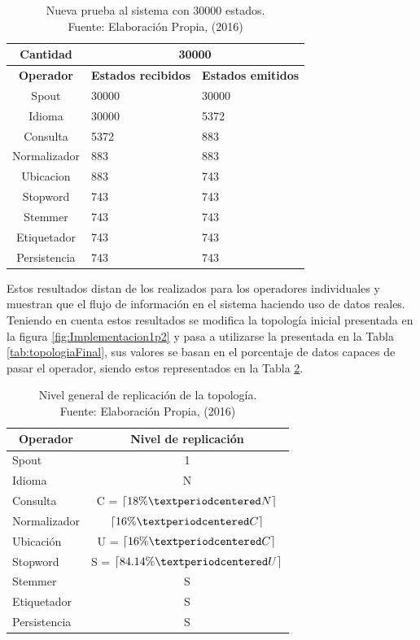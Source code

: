 \begin{table}[H]
\centering
\caption[Nueva prueba al sistema con 30000 estados.]{Nueva prueba al sistema con 30000 estados.\\Fuente: Elaboración Propia, (2016)}
\label{tab:sistemaCompletoEstadosCorregidos}
\begin{tabular}{|c|l|l|}
\hline
\textbf{Cantidad} & \multicolumn{2}{c|}{\textbf{30000}} \\ \hline
\textbf{Operador} & \multicolumn{1}{c|}{\textbf{Estados recibidos}} & \multicolumn{1}{c|}{\textbf{Estados emitidos}} \\ \hline
Spout & 30000 & 30000 \\ \hline
Idioma & 30000 & 5372 \\ \hline
Consulta & 5372 & 883 \\ \hline
Normalizador & 883 & 883 \\ \hline
Ubicacion & 883 & 743 \\ \hline
Stopword & 743 & 743 \\ \hline
Stemmer & 743 & 743 \\ \hline
Etiquetador & 743 & 743 \\ \hline
Persistencia & 743 & 743 \\ \hline
\end{tabular}
\end{table}

Estos resultados distan de los realizados para los operadores individuales y muestran que el flujo de información en el sistema haciendo uso de datos reales. Teniendo en cuenta estos resultados se modifica la topología inicial presentada en la figura \ref{fig:Implementacion1p2} y pasa a utilizarse la presentada en la Tabla \ref{tab:topologiaFinal}, sus valores se basan en el porcentaje de datos capaces de pasar el operador, siendo estos representados en la Tabla \ref{tab:topologiaFinal2}.

\begin{table}[H]
\caption[Nivel general de replicación de la topología.]{Nivel general de replicación de la topología.\\Fuente: Elaboración Propia, (2016)}
\centering
\label{tab:topologiaFinal2}
\begin{tabular}{|l|c|}
\hline
\multicolumn{1}{|c|}{\textbf{Operador}} & \textbf{Nivel de replicación} \\ \hline
Spout & 1 \\ \hline
Idioma & N \\ \hline
Consulta & C = $\ceil{18\% · N}$ \\ \hline
Normalizador & $\ceil{16\% · C}$ \\ \hline
Ubicación & U = $\ceil{16\% · C}$ \\ \hline
Stopword & S = $\ceil{84.14\% · U}$ \\ \hline
Stemmer & S \\ \hline
Etiquetador & S \\ \hline
Persistencia & S \\ \hline
\end{tabular}
\end{table}
        
